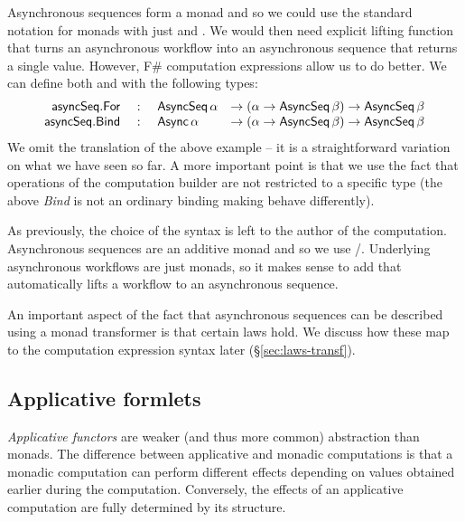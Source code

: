 \documentclass[runningheads,a4paper]{llncs}
\begin{document}
Asynchronous sequences form a monad and so we could use the standard notation for monads with
just  and . We would then need explicit lifting function that turns
an asynchronous workflow into an asynchronous sequence that returns a single value. However,
F\# computation expressions allow us to do better. We can define both  and 
 with the following types:
%
\begin{equation*}
\begin{array}{rcll}
\textnormal{\sffamily asyncSeq}.\textnormal{\sffamily For} &~:~& \textnormal{\sffamily AsyncSeq}\,\alpha &
   \rightarrow (\alpha \rightarrow \textnormal{\sffamily AsyncSeq}\,\beta) \rightarrow \textnormal{\sffamily AsyncSeq}\,\beta\\
\textnormal{\sffamily asyncSeq}.\textnormal{\sffamily Bind} &~:~& \textnormal{\sffamily Async}\,\alpha   &
   \rightarrow (\alpha \rightarrow \textnormal{\sffamily AsyncSeq}\,\beta) \rightarrow \textnormal{\sffamily AsyncSeq}\,\beta\\
\end{array}
\end{equation*}
%
We omit the translation of the above example -- it is a straightforward variation on what we have 
seen so far. A more important point is that we use the fact that operations
of the computation builder are not restricted to a specific type (the above \emph{Bind} 
is not an ordinary binding making  behave differently).

As previously, the choice of the syntax is left to the author of the computation. Asynchronous
sequences are an additive monad and so we use /. Underlying
asynchronous workflows are just monads, so it makes sense to add  that automatically
lifts a workflow to an asynchronous sequence.

An important aspect of the fact that asynchronous sequences can be described using a monad
transformer is that certain laws hold. We discuss how these map to the computation expression syntax
later (\S\ref{sec:laws-transf}).


\subsection{Applicative formlets}
\label{sec:intro-formlets}

\emph{Applicative functors} \cite{applicative,idioms-obliv} are weaker (and thus more common) 
abstraction than monads. The difference between applicative and monadic computations is that 
a monadic computation can perform different effects depending on values obtained earlier during the 
computation. Conversely, the effects of an applicative computation are fully determined 
by its structure. 
\end{document}
